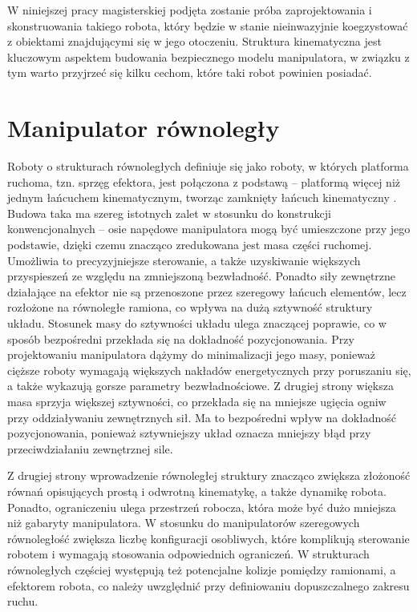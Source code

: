 \documentclass[printmode]{mgr}
\begin{document}
W niniejszej pracy magisterskiej podjęta zostanie próba zaprojektowania i skonstruowania takiego robota, który
będzie w stanie nieinwazyjnie koegzystować z obiektami znajdującymi się w jego otoczeniu. Struktura kinematyczna
jest kluczowym aspektem budowania bezpiecznego modelu manipulatora, w związku z tym warto przyjrzeć się kilku
cechom, które taki robot powinien posiadać.

\section{Manipulator równoległy}
Roboty o strukturach równoległych definiuje się jako roboty, w których platforma ruchoma, tzn. sprzęg efektora, jest połączona
z podstawą -- platformą więcej niż jednym łańcuchem kinematycznym, tworząc zamknięty łańcuch kinematyczny \cite{honczarenko}.
Budowa taka ma szereg istotnych zalet w stosunku do konstrukcji konwencjonalnych -- osie napędowe manipulatora
mogą być umieszczone przy jego podstawie, dzięki czemu znacząco zredukowana jest masa części ruchomej. Umożliwia to precyzyjniejsze sterowanie,
a także uzyskiwanie większych przyspieszeń ze względu na zmniejszoną bezwładność. Ponadto siły zewnętrzne działające na efektor
nie są przenoszone przez szeregowy łańcuch elementów, lecz rozłożone na równoległe ramiona, co wpływa na dużą sztywność struktury układu.
Stosunek masy do sztywności układu ulega znaczącej poprawie, co w sposób bezpośredni przekłada się na dokładność pozycjonowania.
Przy projektowaniu manipulatora dążymy do minimalizacji jego masy, ponieważ cięższe roboty wymagają większych nakładów
energetycznych przy poruszaniu się, a także wykazują gorsze parametry bezwładnościowe. Z drugiej strony większa masa sprzyja większej sztywności,
co przekłada się na mniejsze ugięcia ogniw przy oddziaływaniu zewnętrznych sił. Ma to bezpośredni wpływ na dokładność pozycjonowania, 
ponieważ sztywniejszy układ oznacza mniejszy błąd przy przeciwdziałaniu zewnętrznej sile.

Z drugiej strony wprowadzenie równoległej struktury znacząco zwiększa złożoność równań opisujących prostą i odwrotną kinematykę, a także
dynamikę robota.
Ponadto, ograniczeniu ulega przestrzeń robocza, która może być dużo mniejsza niż gabaryty manipulatora. 
W stosunku do manipulatorów szeregowych równoległość zwiększa liczbę konfiguracji osobliwych, 
które komplikują sterowanie robotem i wymagają stosowania odpowiednich ograniczeń.
W strukturach równoległych częściej występują też potencjalne kolizje pomiędzy ramionami, a efektorem robota, co należy uwzględnić przy
definiowaniu dopuszczalnego zakresu ruchu.
\end{document}

